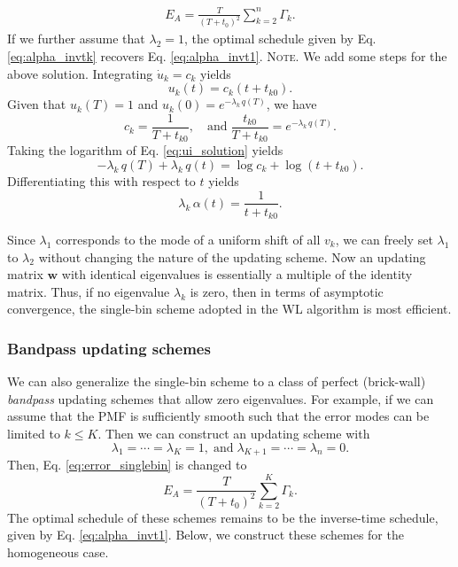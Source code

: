 \documentclass[reprint, floatfix]{revtex4-1}
\newcommand{\note}[1]{{\color{DarkGreen}\footnotesize \textsc{Note.} #1}}
\begin{document}
\begin{align}
  E_A
  =
  \frac{       T     }
       { (T + t_0)^2 }
  \sum_{ k = 2 }^n
    \Gamma_k
  .
\label{eq:error_singlebin}
\end{align}
%
If we further assume that $\lambda_2 = 1$,
the optimal schedule given by Eq. \eqref{eq:alpha_invtk}
recovers Eq. \eqref{eq:alpha_invt1}.
%
\note{We add some steps for the above solution.
  Integrating $\dot u_k = c_k$ yields
  \begin{equation}
  u_k(t) = c_k \left(t + t_{k0} \right).
  \label{eq:ui_solution}
  \end{equation}
  Given that $u_k(T) = 1$ and $u_k(0) = e^{-\lambda_k \, q(T)}$,
  we have
  $$
  c_k = \frac{ 1 }{ T + t_{k0} },
  \quad
  \mathrm{and\;}
  \frac{ t_{k0} } { T + t_{k0} }
  =
  e^{ -\lambda_k \, q(T) }.
  $$
  Taking the logarithm of Eq. \eqref{eq:ui_solution} yields
  $$
  -\lambda_k \, q(T) + \lambda_k \, q(t)
  = \log c_k + \log\left( t + t_{k0} \right).
  $$
  Differentiating this with respect to $t$ yields
  $$
  \lambda_k \, \alpha(t)
  =
  \frac {     1      }
        { t + t_{k0} }.
  $$
}

Since $\lambda_1$ corresponds to the mode
of a uniform shift of all $v_k$,
we can freely set $\lambda_1$ to $\lambda_2$
without changing the nature of the updating scheme.
%
Now an updating matrix $\mathbf w$
with identical eigenvalues
is essentially a multiple of the identity matrix.
%
Thus, if no eigenvalue $\lambda_k$ is zero,
then in terms of asymptotic convergence,
the single-bin scheme adopted in the WL algorithm
is most efficient.



\subsubsection{\label{sec:optscheme}
Bandpass updating schemes}


We can also generalize
the single-bin scheme to a class of
perfect (brick-wall) \emph{bandpass} updating schemes
that allow zero eigenvalues.
%
For example,
if we can assume that the PMF is sufficiently smooth
such that the error modes can be limited to $k \le K$.
%
Then we can construct an updating scheme with
$$
\lambda_1 = \cdots = \lambda_K = 1,
\mathrm{\; and \;}
\lambda_{K+1} = \cdots = \lambda_n = 0.
$$
%
Then,
Eq. \eqref{eq:error_singlebin} is changed to
%
\begin{equation}
  E_A
  =
  \frac {       T     }
        { (T + t_0)^2 }
  \sum_{ k = 2 }^K
    \Gamma_k.
\label{eq:error_asym_sinc}
\end{equation}
%
The optimal schedule of these schemes
remains to be the inverse-time schedule,
given by Eq. \eqref{eq:alpha_invt1}.
%
Below, we construct these schemes for
the homogeneous case.
\end{document}
